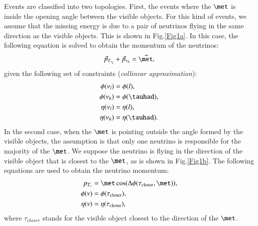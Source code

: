 Events are classified into two topologies. First, the events where the $\met$ is inside the opening angle between the visible objects. For this kind of events, we assume that the missing energy is due to a pair of neutrinos flying in the same direction as the visible objects. This is shown in Fig.\ref{Fig1a}. In this case, the following equation is solved to obtain the momentum of the neutrinos:
\begin{equation}
\vec{p}_{T_{\nu_l}}+\vec{p}_{\nu_h}=\vec{\met},
\end{equation}
given the following set of constraints (\textit{collinear approximation}):
\begin{align}
	\phi(\nu_l)&=\phi(l),
	\\
	\phi(\nu_h)&=\phi(\tauhad),
	\\
	\eta(\nu_l)&=\eta(l),
	\\
	\eta(\nu_h)&=\eta(\tauhad).
\end{align}
In the second case, when the $\met$ is pointing outside the angle formed by the visible objects, the assumption is that only one neutrino is responsible for the majority of the $\met$. We suppose the neutrino is flying in the direction of the visible object that is closest to the $\met$, as is shown in Fig.\ref{Fig1b}. The following equations are used to obtain the neutrino momentum:
\begin{align}
	p_{T_{\nu}}&=\met \cos(\Delta\phi(\tau_{\text{closer}},\met)),
	\\
	\phi(\nu)&=\phi(\tau_{\text{closer}}),
	\\
	\eta(\nu)&=\eta(\tau_{\text{closer}}),
\end{align} 
where $\tau_{closer}$ stands for the visible object closest to the direction of the $\met$.

